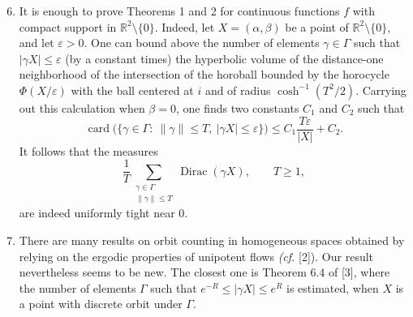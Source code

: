 \documentclass[11pt]{article}
\theoremstyle{remark}
\newcommand{\R}{\mathbb{R}}
\newcommand{\card}{\operatorname{card}}
\newcommand{\Dirac}{\operatorname{Dirac}}
\begin{document}
\begin{enumerate}
\setcounter{enumi}{5}
\item It is enough to prove Theorems 1 and 2 for continuous functions $f$ with compact support in $\R^2\setminus\{0\}$. Indeed, let $X=(\alpha,\beta)$ be a point of $\R^2\setminus\{0\}$, and let $\varepsilon>0$. One can bound above the number of elements $\gamma\in\Gamma$ such that %
$|\gamma X|\le\varepsilon$ (by a constant times) the hyperbolic volume of the distance-one neighborhood of the intersection of the horoball bounded by the horocycle $\Phi(X/\varepsilon)$ with the ball centered at $i$ and of radius $\cosh^{-1}(T^2/2)$. Carrying out this calculation when $\beta=0$, one finds two constants $C_1$ and $C_2$ such that
\[
\card\bigl(\{\gamma\in\Gamma:\ \|\gamma\|\le T,\ |\gamma X|\le\varepsilon\}\bigr)
\le C_1\frac{T\varepsilon}{|X|}+C_2.
\]
It follows that the measures
\[
\frac{1}{T}\sum_{\substack{\gamma\in\Gamma\\ \|\gamma\|\le T}}\Dirac(\gamma X),\qquad T\ge1,
\]
are indeed uniformly tight near $0$.

\item There are many results on orbit counting in homogeneous spaces obtained by relying on the ergodic properties of unipotent flows \emph{(cf.} [2]). Our result nevertheless seems to be new. The closest one is Theorem 6.4 of [3], where the number of elements $\Gamma$ such that
$e^{-R}\le |\gamma X|\le e^R$ is estimated, when $X$ is a point with discrete orbit under $\Gamma$.
\end{enumerate}
\end{document}
